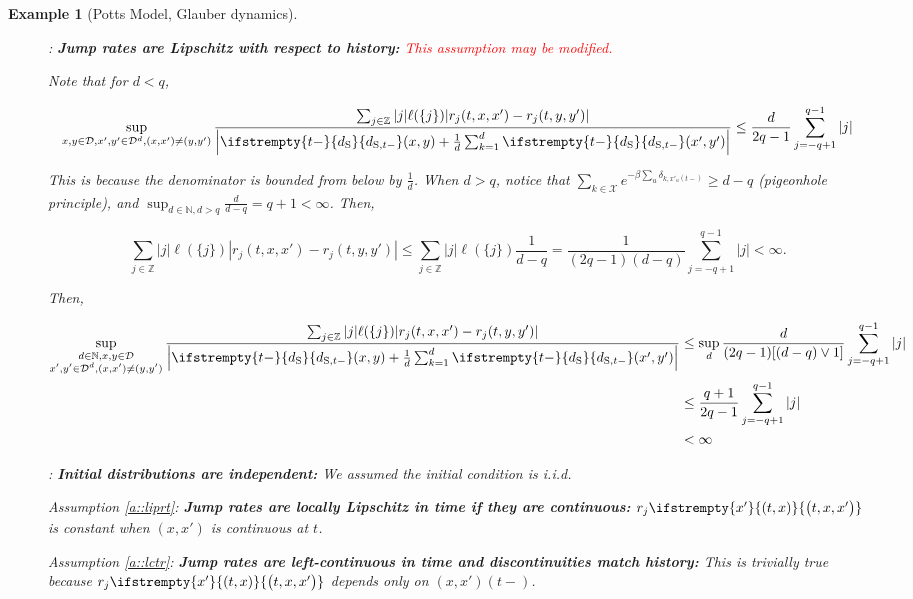 \documentclass[12pt]{article}
\newcommand{\mb}{\mathbb}
\newcommand{\mc}{\mathcal}
\newcommand{\te}{\text}
\newcommand{\tr}{\textcolor{red}}
\newcommand{\cad}{\mc{D}}							%
\newcommand{\sta}{\mc{X}}							%
\newcommand{\Sm}{\ell}								%
\newcommand{\rate}{r}								%
\newcommand{\stmet}[1]{
\ifstrempty{#1}{
	d_{\te{S}}}{
	d_{\te{S},#1}}}									%
\newcommand{\xf}{x}									%
\newcommand{\xg}{y}									%
\newcommand{\vind}[1]{_{#1}}						%
\newcommand{\tme}[1]{(#1)}							%
\newcommand{\stpara}[1]{_{#1}}						%
\newcommand{\tmepro}[3]{
\ifstrempty{#3}{
	\left(#1,#2\right)}{
	\left(#1,#2,#3\right)}}							%
\newtheorem{example}[thms]{Example}
\begin{document}
\begin{example}[Potts Model, Glauber dynamics]
\begin{description}
\item[] \cite[Assumption \ref{F-a::liprx}]{F}: \textbf{Jump rates are Lipschitz with respect to history:} \tr{This assumption may be modified.}

Note that for \(d < q\),

\begin{align*}
\sup_{\xf,\xg\in \cad,\xf',\xg' \in \cad^d, (\xf,\xf')\neq(\xg,\xg')} \frac{\sum_{j \in \mb{Z}}|j|\Sm(\{j\})|\rate\stpara{j}(t,\xf,\xf') - \rate\stpara{j}(t,\xg,\xg')|}{\left|\stmet{t-}(\xf,\xg) + \frac{1}{d}\sum_{k=1}^d \stmet{t-}(\xf',\xg')\right|} \leq \frac{d}{2q-1}\sum_{j=-q+1}^{q-1} |j|
\end{align*}

This is because the denominator is bounded from below by \(\frac{1}{d}\). When \(d > q\), notice that \(\sum_{k\in\sta}e^{-\beta\sum_u \delta_{k,\xf'\vind{u}\tme{t-}}} \geq d-q\) (pigeonhole principle), and \(\sup_{d\in \mb{N},d > q} \frac{d}{d-q} = q+1 < \infty\). Then,

\[\sum_{j \in \mb{Z}}|j|\Sm(\{j\})|\rate\stpara{j}(t,\xf,\xf') - \rate\stpara{j}(t,\xg,\xg')|\leq \sum_{j \in \mb{Z}}|j|\Sm(\{j\})\frac{1}{d-q} = \frac{1}{(2q-1)(d-q)}\sum_{j=-q+1}^{q-1}|j| < \infty.\]

Then,

\begin{align*}
\sup_{\substack{d \in\mb{N},\xf,\xg\in \cad\\ \xf',\xg' \in \cad^d, (\xf,\xf')\neq(\xg,\xg')}} \frac{\sum_{j \in \mb{Z}}|j|\Sm(\{j\})|\rate\stpara{j}(t,\xf,\xf') - \rate\stpara{j}(t,\xg,\xg')|}{\left|\stmet{t-}(\xf,\xg) + \frac{1}{d}\sum_{k=1}^d \stmet{t-}(\xf',\xg')\right|} &\leq \sup_d \frac{d}{(2q-1)[(d-q)\vee 1]}\sum_{j=-q+1}^{q-1}|j|\\
& \leq \frac{q+1}{2q-1}\sum_{j=-q+1}^{q-1}|j|\\
& < \infty
\end{align*}

\item[] \cite[Assumption \ref{F-CI::indinit}]{F}: \textbf{Initial distributions are independent:} We assumed the initial condition is i.i.d.

\item[] Assumption \ref{a::liprt}: \textbf{Jump rates are locally Lipschitz in time if they are continuous:} \(\rate\stpara{j}\tmepro{t}{\xf}{\xf'}\) is constant when \((\xf,\xf')\) is continuous at \(t\).

\item[] Assumption \ref{a::lctr}: \textbf{Jump rates are left-continuous in time and discontinuities match history:} This is trivially true because \(\rate\stpara{j}\tmepro{t}{\xf}{\xf'}\) depends only on \((\xf,\xf')\tme{t-}\).


\end{description}
\end{example}
\end{document}
